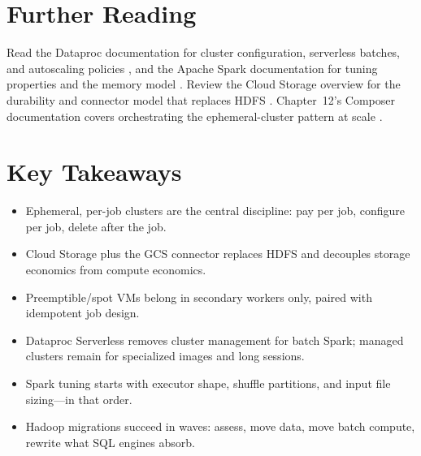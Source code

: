 \section{Further Reading}
Read the Dataproc documentation for cluster configuration, serverless batches, and autoscaling policies \cite{googleclouddataprocdocs}, and the Apache Spark documentation for tuning properties and the memory model \cite{apachesparkdocs}. Review the Cloud Storage overview for the durability and connector model that replaces HDFS \cite{googlecloudstorageoverview}. Chapter~12's Composer documentation covers orchestrating the ephemeral-cluster pattern at scale \cite{googlecloudcomposerdocs}.

\section*{Key Takeaways}
\begin{itemize}
    \item Ephemeral, per-job clusters are the central discipline: pay per job, configure per job, delete after the job.
    \item Cloud Storage plus the GCS connector replaces HDFS and decouples storage economics from compute economics.
    \item Preemptible/spot VMs belong in secondary workers only, paired with idempotent job design.
    \item Dataproc Serverless removes cluster management for batch Spark; managed clusters remain for specialized images and long sessions.
    \item Spark tuning starts with executor shape, shuffle partitions, and input file sizing---in that order.
    \item Hadoop migrations succeed in waves: assess, move data, move batch compute, rewrite what SQL engines absorb.
\end{itemize}

